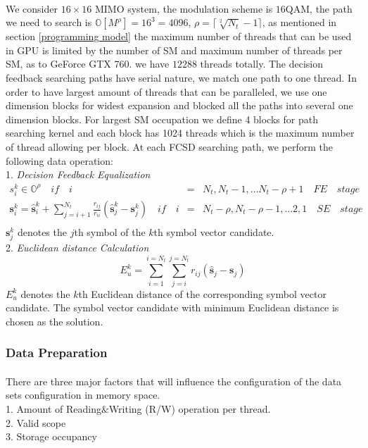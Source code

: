 \documentclass[12pt,a4paper,final]{article}
\begin{document}
\begin{spacing}{2.5}
  \paragraph{}We consider $16\times 16$ MIMO system, the modulation scheme is $16$QAM, the path we need to search is $\mathbb{O}[M^{\rho}]=16^{3}=4096$, $\rho=\lceil \sqrt[2]{N_{t}}-1\rceil$, as mentioned in section \ref{programming model} the maximum number of threads that can be used in GPU is limited by the number of SM and maximum number of threads per SM, as to GeForce GTX 760. we have $12288$ threads totally. The decision feedback searching paths have serial nature, we match one path to one thread. In order to have largest amount of threads that can be paralleled, we use one dimension blocks for widest expansion and blocked all the paths into several one dimension blocks. For largest SM occupation we define 4 blocks for path searching kernel and each block has 1024 threads which is the maximum number of thread allowing per block. At each FCSD searching path, we perform the following data operation:\\
1. \emph{Decision Feedback Equalization}\\
\begin{eqnarray}
\nonumber
{s}_{i}^{k}\in \mathbb{O}^{\rho}      \quad if\quad i&=&N_{t},N_{t}-1,\dots N_{t}-\rho+1\quad FE \quad stage\\
\nonumber
\mathbf{s}_{i}^{k}=\mathbf{\hat{s}}_{i}^{k}+\sum_{j=i+1}^{N_{t}}\frac{r_{ij}}{r_{ii}}(\mathbf{\hat{s}}_{j}^{k}-\mathbf{s}_{j}^{k})\quad if\quad i &=& N_{t}-\rho,N_{t}-\rho-1,\dots 2,1\quad SE\quad stage\\  \label{path searching}
\end{eqnarray}
$\mathbf{s}_{j}^{k}$ denotes the $j$th symbol of the $k$th symbol vector candidate.\\
2. \emph{Euclidean distance Calculation}\\
\begin{equation}
E_{u}^{k}=\sum_{i=1}^{i=N_{t}}\sum_{j=i}^{j=N_{t}}r_{ij}(\mathbf{\hat{s}}_{j}-\mathbf{s}_{j})\label{Eu metric}
\end{equation}
$E_{u}^{k}$ denotes the $k$th Euclidean distance of the corresponding symbol vector candidate. The symbol vector candidate with minimum Euclidean distance is chosen as the solution.  
\subsubsection{Data Preparation}\label{data preparation}
\paragraph{}There are three major factors that will influence the configuration of the data sets configuration in memory space.\\
1. Amount of Reading$\&$Writing (R/W) operation per thread.\\
2. Valid scope\\
3. Storage occupancy\\

\end{spacing}
\end{document}
